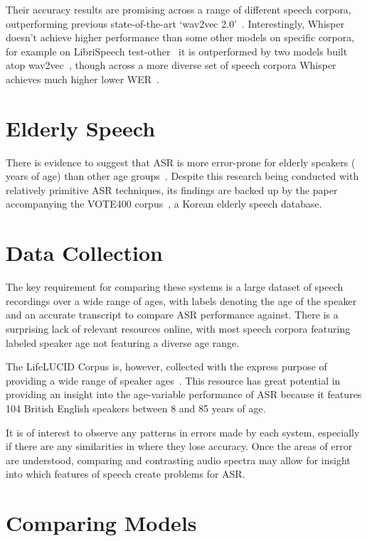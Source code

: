 Their accuracy results are promising across a range of different speech corpora, outperforming
previous state-of-the-art `wav2vec 2.0'~\cite{wav2vec}.
Interestingly, Whisper doesn't achieve higher performance than some other models on specific
corpora, for example on LibriSpeech test-other~\cite{librispeech} it is outperformed by
two models built atop wav2vec~\cite{zhang2020,chung2021}, though across a more diverse set
of speech corpora Whisper achieves much higher lower WER~\cite{whisper}.\\

\section{Elderly Speech}\label{sec:elderly-speech}

There is evidence to suggest that ASR is more error-prone for elderly speakers ( years of
age) than other age groups~\cite{picone1990}.
Despite this research being conducted with relatively primitive ASR techniques, its findings are
backed up by the paper accompanying the VOTE400 corpus~\cite{vote400}, a Korean elderly speech
database.


\section{Data Collection}\label{sec:data-collection}

The key requirement for comparing these systems is a large dataset of speech recordings over a
wide range of ages, with labels denoting the age of the speaker and an accurate transcript to
compare ASR performance against.
There is a surprising lack of relevant resources online, with most speech corpora featuring
labeled speaker age not featuring a diverse age range.

The LifeLUCID Corpus is, however, collected with the express purpose of providing a wide range of
speaker ages~\cite{lifelucid}.
This resource has great potential in providing an insight into the age-variable performance of
ASR because it features 104 British English speakers between 8 and 85 years of age.

It is of interest to observe any patterns in errors made by each system, especially if there are
any similarities in where they lose accuracy.
Once the areas of error are understood, comparing and contrasting audio spectra may allow for
insight into which features of speech create problems for ASR\@.

\section{Comparing Models}
